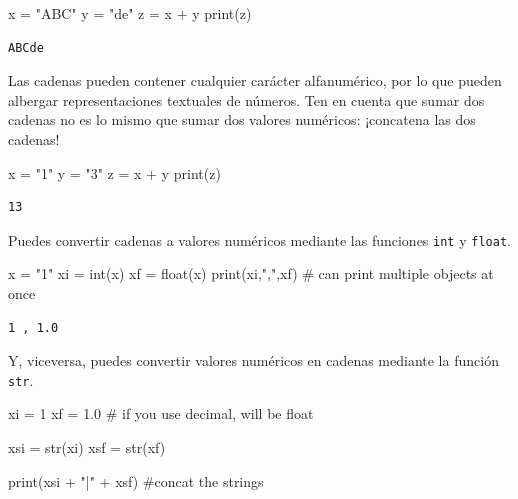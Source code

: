 \documentclass[
  letterpaper,
]{scrbook}
\newenvironment{Shaded}{\begin{snugshade}}{\end{snugshade}}
\newcommand{\BuiltInTok}[1]{\textcolor[rgb]{0.00,0.23,0.31}{#1}}
\newcommand{\CommentTok}[1]{\textcolor[rgb]{0.37,0.37,0.37}{#1}}
\newcommand{\DecValTok}[1]{\textcolor[rgb]{0.68,0.00,0.00}{#1}}
\newcommand{\FloatTok}[1]{\textcolor[rgb]{0.68,0.00,0.00}{#1}}
\newcommand{\NormalTok}[1]{\textcolor[rgb]{0.00,0.23,0.31}{#1}}
\newcommand{\OperatorTok}[1]{\textcolor[rgb]{0.37,0.37,0.37}{#1}}
\newcommand{\StringTok}[1]{\textcolor[rgb]{0.13,0.47,0.30}{#1}}
\begin{document}
\begin{Shaded}
\begin{Highlighting}[]
\NormalTok{x }\OperatorTok{=} \StringTok{"ABC"}
\NormalTok{y }\OperatorTok{=} \StringTok{"de"}
\NormalTok{z }\OperatorTok{=}\NormalTok{ x }\OperatorTok{+}\NormalTok{ y}
\BuiltInTok{print}\NormalTok{(z)}
\end{Highlighting}
\end{Shaded}

\begin{verbatim}
ABCde
\end{verbatim}

Las cadenas pueden contener cualquier carácter alfanumérico, por lo que
pueden albergar representaciones textuales de números. Ten en cuenta que
sumar dos cadenas no es lo mismo que sumar dos valores numéricos:
¡concatena las dos cadenas!

\begin{Shaded}
\begin{Highlighting}[]
\NormalTok{x }\OperatorTok{=} \StringTok{"1"}
\NormalTok{y }\OperatorTok{=} \StringTok{"3"}
\NormalTok{z }\OperatorTok{=}\NormalTok{ x }\OperatorTok{+}\NormalTok{ y}
\BuiltInTok{print}\NormalTok{(z)}
\end{Highlighting}
\end{Shaded}

\begin{verbatim}
13
\end{verbatim}

Puedes convertir cadenas a valores numéricos mediante las funciones
\texttt{int} y \texttt{float}.

\begin{Shaded}
\begin{Highlighting}[]
\NormalTok{x }\OperatorTok{=} \StringTok{"1"}
\NormalTok{xi }\OperatorTok{=} \BuiltInTok{int}\NormalTok{(x)}
\NormalTok{xf }\OperatorTok{=} \BuiltInTok{float}\NormalTok{(x)}
\BuiltInTok{print}\NormalTok{(xi,}\StringTok{","}\NormalTok{,xf) }\CommentTok{\# can print multiple objects at once}
\end{Highlighting}
\end{Shaded}

\begin{verbatim}
1 , 1.0
\end{verbatim}

Y, viceversa, puedes convertir valores numéricos en cadenas mediante la
función \texttt{str}.

\begin{Shaded}
\begin{Highlighting}[]
\NormalTok{xi }\OperatorTok{=} \DecValTok{1}
\NormalTok{xf }\OperatorTok{=} \FloatTok{1.0} \CommentTok{\# if you use decimal, will be float}

\NormalTok{xsi }\OperatorTok{=} \BuiltInTok{str}\NormalTok{(xi)}
\NormalTok{xsf }\OperatorTok{=} \BuiltInTok{str}\NormalTok{(xf)}

\BuiltInTok{print}\NormalTok{(xsi }\OperatorTok{+} \StringTok{"|"} \OperatorTok{+}\NormalTok{ xsf) }\CommentTok{\#concat the strings}
\end{Highlighting}
\end{Shaded}
\end{document}
